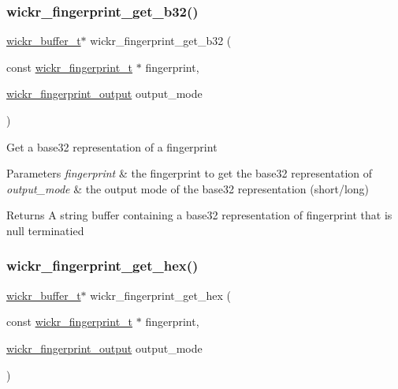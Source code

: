 \subsubsection{\texorpdfstring{wickr\+\_\+fingerprint\+\_\+get\+\_\+b32()}{wickr\_fingerprint\_get\_b32()}}
{\footnotesize\ttfamily \mbox{\hyperlink{structwickr__buffer}{wickr\+\_\+buffer\+\_\+t}}$\ast$ wickr\+\_\+fingerprint\+\_\+get\+\_\+b32 (\begin{DoxyParamCaption}\item[{const \mbox{\hyperlink{structwickr__fingerprint}{wickr\+\_\+fingerprint\+\_\+t}} $\ast$}]{fingerprint,  }\item[{\mbox{\hyperlink{group__wickr__fingerprint_gafaac3f13daae0b97e91f3fb744f4c9e2}{wickr\+\_\+fingerprint\+\_\+output}}}]{output\+\_\+mode }\end{DoxyParamCaption})}

Get a base32 representation of a fingerprint


\begin{DoxyParams}{Parameters}
{\em fingerprint} & the fingerprint to get the base32 representation of \\
\hline
{\em output\+\_\+mode} & the output mode of the base32 representation (short/long) \\
\hline
\end{DoxyParams}
\begin{DoxyReturn}{Returns}
A string buffer containing a base32 representation of \textquotesingle{}fingerprint\textquotesingle{} that is null terminatied 
\end{DoxyReturn}
\mbox{\label{group__wickr__fingerprint_ga50608413a9168b144e06d7537a789df1}} 
\subsubsection{\texorpdfstring{wickr\+\_\+fingerprint\+\_\+get\+\_\+hex()}{wickr\_fingerprint\_get\_hex()}}
{\footnotesize\ttfamily \mbox{\hyperlink{structwickr__buffer}{wickr\+\_\+buffer\+\_\+t}}$\ast$ wickr\+\_\+fingerprint\+\_\+get\+\_\+hex (\begin{DoxyParamCaption}\item[{const \mbox{\hyperlink{structwickr__fingerprint}{wickr\+\_\+fingerprint\+\_\+t}} $\ast$}]{fingerprint,  }\item[{\mbox{\hyperlink{group__wickr__fingerprint_gafaac3f13daae0b97e91f3fb744f4c9e2}{wickr\+\_\+fingerprint\+\_\+output}}}]{output\+\_\+mode }\end{DoxyParamCaption})}

